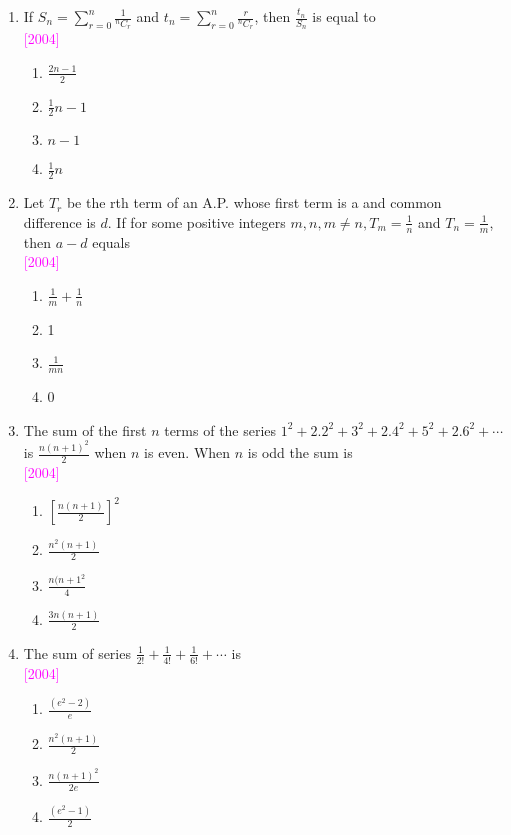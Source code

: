 \documentclass[journal,12pt,twocolumn]{IEEEtran}
\theoremstyle{remark}
\begin{document}
\begin{enumerate}[label=\textcolor{magenta}{\arabic*.}]
\item {If $S_n = \sum\limits_{r=0}^{n} \frac{1}{{}^{n}C_{r}}$ and $t_n = \sum\limits_{r=0}^{n} \frac{r}{{}^{n}C_{r}}$, then $\frac{t_n}{S_n}$ is equal to}\\ \textcolor {magenta}{\hfill{[2004]}} \\
\begin{enumerate}[label={(\alph*)}]
\item  {$\frac{2n-1}{2}$}
\item  {$\frac{1}{2}n-1$}
\item  {$n-1$}
\item  {$\frac{1}{2}n$}
\end{enumerate}

\item {Let $T_r$ be the rth term of an A.P. whose first term is a and common difference is $d$. If for some positive integers $m,n, m\neq n, T_m = \frac{1}{n}$ and $T_n = \frac{1}{m}$, then $a-d$ equals}\\ \textcolor {magenta}{\hfill{[2004]}} \\
\begin{enumerate}[label={(\alph*)}]
\item  {$\frac{1}{m}+\frac{1}{n}$}
\item  {1}
\item  {$\frac{1}{mn}$}
\item  {0}
\end{enumerate}

\item {The sum of the first $n$ terms of the series $1^2+2.2^2+3^2+2.4^2+5^2+2.6^2+\cdots$ is $\frac{n(n+1)^2}{2}$ when $n$ is even. When $n$ is odd the sum is}\\ \textcolor {magenta}{\hfill{[2004]}} \\
\begin{enumerate}[label={(\alph*)}]
\item  {$\left[\frac{n(n+1)}{2}\right]^2$}
\item  {$\frac{n^2(n+1)}{2}$}
\item  {$\frac{n(n+1^2}{4}$}
\item  {$\frac{3n(n+1)}{2}$}
\end{enumerate}

\item {The sum of series $\frac{1}{2!}+\frac{1}{4!}+\frac{1}{6!}+\cdots$ is}\\ \textcolor {magenta}{\hfill{[2004]}} \\
\begin{enumerate}[label={(\alph*)}]
\item  {$\frac{(e^2-2)}{e}$}
\item  {$\frac{n^2(n+1)}{2}$}
\item  {$\frac{n(n+1)^2}{2e}$}
\item  {$\frac{(e^2-1)}{2}$}
\end{enumerate}


\end{enumerate}
\end{document}
